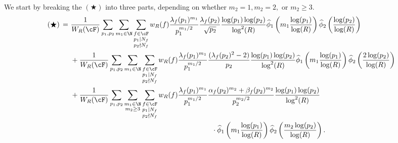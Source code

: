\documentclass[11pt, reqno]{amsart}
\theoremstyle{definition}
\theoremstyle{remark}
\numberwithin{equation}{section}
\renewcommand{\hat}{\widehat}
\begin{document}
We start by breaking the $(\bigstar)$ into three parts, depending on whether $m_2 =1, m_2=2, $ or $m_2 \geq 3$.
\small{\begin{align}
    (\bigstar)\,= \, \nonumber\,&\frac{1}{W_R(\cF)}\sum_{p_1,p_2}\sum_{m_1\in \N}\sum_{\substack{f\in \cF\\p_1|N_f\\p_2\nmid N_f }}w_R(f)\frac{\lambda_f(p_1)^{m_1}}{p_1^{m_1/2}}\frac{\lambda_f(p_2)}{\sqrt{p_2}} \frac{\log(p_1)\log (p_2)}{\log^2(R)}\hat\phi_1 \left(m_1 \frac{\log(p_1)}{\log(R)}\right)\hat \phi_2 \left(\frac{\log(p_2)}{\log(R)}\right) \\\nonumber&+  \frac{1}{W_R(\cF)}\sum_{p_1,p_2}\sum_{m_1\in \N}\sum_{\substack{f\in \cF\\p_1|N_f\\p_2\nmid N_f }}w_R(f)\frac{\lambda_f(p_1)^{m_1}}{p_1^{m_1/2}}\frac{(\lambda_f(p_2)^2-2)}{p_2} \frac{\log(p_1)\log (p_2)}{\log^2(R)}\hat\phi_1 \left(m_1 \frac{\log(p_1)}{\log(R)}\right)\hat \phi_2 \left(\frac{2\log(p_2)}{\log(R)}\right)\\\label{eq: case 2 sum m2 geq 3}
    &+\frac{1}{W_R(\cF)}\sum_{p_1,p_2}\sum_{\substack{m_1\in \N\\m_2\geq 3}}\sum_{\substack{f\in \cF\\p_1|N_f\\p_2\nmid N_f }}w_R(f)\frac{\lambda_f(p_1)^{m_1}}{p_1^{m_1/2}}\frac{\alpha_f(p_2)^{m_2}+\beta_f(p_2)^{m_2}}{p_2^{m_2/2}} \frac{\log(p_1)\log (p_2)}{\log^2(R)} \notag \\ &\qquad \qquad \qquad \qquad \qquad \qquad \qquad \qquad \qquad \qquad \cdot \hat\phi_1 \left(m_1 \frac{\log(p_1)}{\log(R)}\right)\hat \phi_2 \left(\frac{m_2\log(p_2)}{\log(R)}\right).
\end{align}} \normalsize
\end{document}
